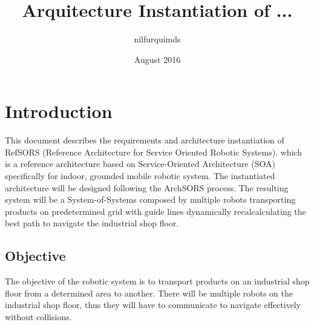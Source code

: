 \documentclass{article}
\title{Arquitecture Instantiation of ...}
\author{nilfurquimds}
\date{August 2016}
\begin{document}
\maketitle

\section*{Introduction}
This document describes the requirements and architecture instantiation of RefSORS (Reference Architecture for Service Oriented Robotic Systems). which is a reference architecture based on Service-Oriented Architecture (SOA) specifically for indoor, grounded mobile robotic system. The instantiated architecture will be designed following the ArchSORS process. The resulting system will be a System-of-Systems composed by multiple robots transporting products on predetermined grid with guide lines dynamically recalcalculating the best path to navigate the industrial shop floor.

\subsection*{Objective}
The objective of the robotic system is to transport products on an industrial shop floor from a determined area to another. There will be multiple robots on the industrial shop floor, thus they will have to communicate to navigate effectively without collisions.






\end{document}

